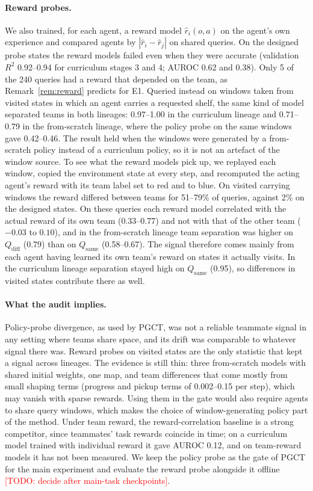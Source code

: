 \documentclass{article}
\theoremstyle{remark}
\newcommand{\todo}[1]{\textcolor{red}{[TODO: #1]}}
\newcommand{\ours}{PGCT}
\begin{document}
\paragraph{Reward probes.} We also trained, for each agent, a reward model $\hat r_i(o,a)$ on the agent's own experience and
compared agents by $|\hat r_i-\hat r_j|$ on shared queries. On the designed probe states the reward models failed even when they
were accurate (validation $R^2$ 0.92--0.94 for curriculum stages 3 and 4; AUROC 0.62 and 0.38). Only 5 of the 240 queries had
a reward that depended on the team, as Remark~\ref{rem:reward} predicts for E1. Queried instead on windows taken from visited
states in which an agent carries a requested shelf, the same kind of model separated teams in both lineages: 0.97--1.00 in the
curriculum lineage and 0.71--0.79 in the from-scratch lineage, where the policy probe on the same windows gave 0.42--0.46. The
result held when the windows were generated by a from-scratch policy instead of a curriculum policy, so it is not an artefact
of the window source. To see what the reward models pick up, we replayed each window, copied the environment state at every
step, and recomputed the acting agent's reward with its team label set to red and to blue. On visited carrying windows the
reward differed between teams for 51--79\% of queries, against 2\% on the designed states. On these queries each reward model
correlated with the actual reward of its own team (0.33--0.77) and not with that of the other team ($-0.03$ to $0.10$), and in
the from-scratch lineage team separation was higher on $Q_{\mathrm{diff}}$ (0.79) than on $Q_{\mathrm{same}}$ (0.58--0.67).
The signal therefore comes mainly from each agent having learned its own team's reward on states it actually visits. In the
curriculum lineage separation stayed high on $Q_{\mathrm{same}}$ (0.95), so differences in visited states contribute there as
well.

\paragraph{What the audit implies.} Policy-probe divergence, as used by \ours{}, was not a reliable teammate signal in any
setting where teams share space, and its drift was comparable to whatever signal there was. Reward probes on visited states are
the only statistic that kept a signal across lineages. The evidence is still thin: three from-scratch models with shared
initial weights, one map, and team differences that come mostly from small shaping terms (progress and pickup terms of
0.002--0.15 per step), which may vanish with sparse rewards. Using them in the gate would also require agents to share query windows,
which makes the choice of window-generating policy part of the method. Under team reward, the reward-correlation baseline is a
strong competitor, since teammates' task rewards coincide in time; on a curriculum model trained with individual reward it gave
AUROC 0.12, and on team-reward models it has not been measured. We keep the policy probe as the gate of \ours{} for the main
experiment and evaluate the reward probe alongside it offline \todo{decide after main-task checkpoints}.
\end{document}
